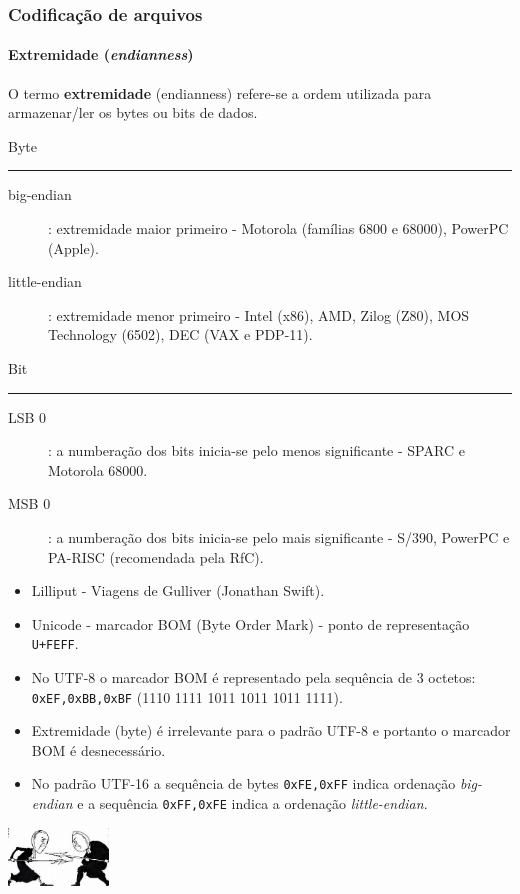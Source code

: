 \begin{frame}[allowframebreaks]
\frametitle{Codificação de arquivos}
\framesubtitle{Extremidade (\textit{endianness})}
  O termo \textbf{extremidade} (endianness) refere-se a ordem utilizada para armazenar/ler os bytes ou bits de dados.

  Byte 
  \hrule
  \begin{description}
  \item[big-endian]: extremidade maior primeiro -  Motorola (famílias 6800 e 68000), PowerPC (Apple).
  \item[little-endian]: extremidade menor primeiro - Intel (x86), AMD, Zilog (Z80), MOS Technology (6502), DEC (VAX e PDP-11).
  \end{description}

  Bit
  \hrule
  \begin{description}
  \item[LSB 0]: a numberação dos bits inicia-se pelo menos significante - SPARC e Motorola 68000.
  \item[MSB 0]: a numberação dos bits inicia-se pelo mais significante - S/390, PowerPC e PA-RISC (recomendada pela RfC).
  \end{description}

  \framebreak
  \begin{itemize}
  \item Lilliput - Viagens de Gulliver (Jonathan Swift).
  \item Unicode - marcador BOM (Byte Order Mark) - ponto de representação \texttt{U+FEFF}.
  \item No UTF-8 o marcador BOM é representado pela sequência de 3 octetos: \texttt{0xEF,0xBB,0xBF} (1110 1111 1011 1011 1011 1111).
  \item Extremidade (byte) é irrelevante para o padrão UTF-8 e portanto o marcador BOM é desnecessário.
  \item No padrão UTF-16 a sequência de bytes \texttt{0xFE,0xFF} indica ordenação \textit{big-endian} e a sequência \texttt{0xFF,0xFE}
        indica a ordenação \textit{little-endian}.
  \end{itemize}

  \hfill\includegraphics[width=0.2\textwidth,height=0.3\textheight,keepaspectratio]{figures/lilliputwar.jpg}
\end{frame}
